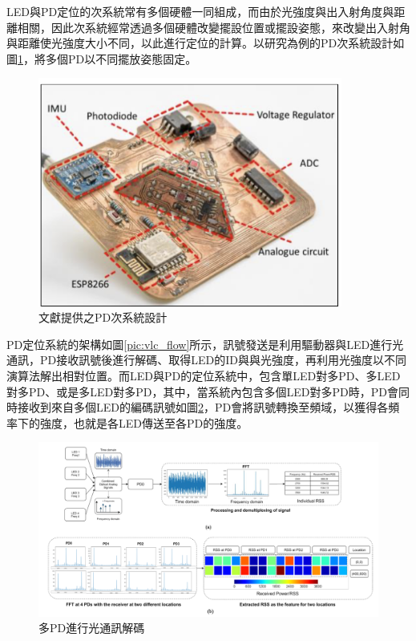 \begin{description}
                    LED與PD定位的次系統常有多個硬體一同組成，而由於光強度與出入射角度與距離相關，因此次系統經常透過多個硬體改變擺設位置或擺設姿態，來改變出入射角與距離使光強度大小不同，以此進行定位的計算。以研究\cite{case:ml}為例的PD次系統設計如圖\ref{pic:ml_pd_config}，將多個PD以不同擺放姿態固定。

                    \begin{figure}[htpb]
                        \centering
                        \includegraphics[width=10cm]{ch2pic/ml_pd_config.png}
                        \caption{文獻提供之PD次系統設計\cite{case:ml}}
                        \label{pic:ml_pd_config}
                    \end{figure}

                    \qquad
                    PD定位系統的架構如圖\ref{pic:vlc_flow}所示，訊號發送是利用驅動器與LED進行光通訊，PD接收訊號後進行解碼、取得LED的ID與與光強度，再利用光強度以不同演算法解出相對位置。而LED與PD的定位系統中，包含單LED對多PD、多LED對多PD、或是多LED對多PD，其中，當系統內包含多個LED對多PD時，PD會同時接收到來自多個LED的編碼訊號如圖\ref{pic:vlc_multi_pd}，PD會將訊號轉換至頻域，以獲得各頻率下的強度，也就是各LED傳送至各PD的強度。

    
                    
                    \begin{figure}[htpb]
                        \centering
                        \includegraphics[width=15cm]{ch2pic/vlc_multi_pd.png}
                        \caption{多PD進行光通訊解碼\cite{case:ml}}
                        \label{pic:vlc_multi_pd}
                    \end{figure}


\end{description}
